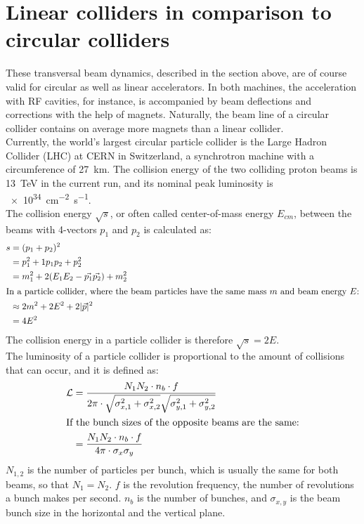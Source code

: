 \section{Linear colliders in comparison to circular colliders}
\label{AccPhysics:Linear-Circular}
These transversal beam dynamics, described in the section above, are of course valid for circular as well as linear accelerators.
In both machines, the acceleration with RF cavities, for instance, is accompanied by beam deflections and corrections with the help of magnets.
Naturally, the beam line of a circular collider contains on average more magnets than a linear collider.\\
Currently, the world's largest circular particle collider is the Large Hadron Collider (LHC) at CERN in Switzerland, a synchrotron machine with a circumference of \SI{27}{\kilo\meter}.
The collision energy of the two colliding proton beams is \SI{13}{\TeV} in the current run, and its nominal peak luminosity \lumi is \SI{e34}{\centi\meter^{-2}\second^{-1}}.~\cite[p. 3]{LHC_Paper}\\
The collision energy $\sqrt{s}$, or often called center-of-mass energy $E_{cm}$, between the beams with 4-vectors $p_1$ and $p_2$ is calculated as:
\begin{align*}
 s &= (p_1+p_2)^2\\
 &=p_1^2+1p_1p_2+p_2^2\\
 &=m_1^2+2(E_1E_2-\vec{p_1}\vec{p_2})+m_2^2\\
\intertext{In a particle collider, where the beam particles have the same mass $m$ and beam energy $E$:}
&\approx2m^2+2E^2+2|\vec{p}|^2\\
&=4E^2
\end{align*}
The collision energy in a particle collider is therefore $\sqrt{s}=2E$.\\
The luminosity of a particle collider is proportional to the amount of collisions that can occur, and it is defined as:
\begin{align}
 \mathcal{L}&=\frac{N_1N_2 \cdot n_b \cdot f}{2\pi \cdot \sqrt{\sigma^2_{x,1}+\sigma^2_{x,2}} \sqrt{\sigma^2_{y,1}+\sigma^2_{y,2}}}\\
 \intertext{If the bunch sizes of the opposite beams are the same:}
 &=\frac{N_1N_2 \cdot n_b \cdot f}{4\pi \cdot \sigma_x \sigma_y}
\end{align}
$N_{1,2}$ is the number of particles per bunch, which is usually the same for both beams, so that $N_1=N_2$.
$f$ is the revolution frequency, the number of revolutions a bunch makes per second.
$n_{b}$ is the number of bunches, and $\sigma_{x,y}$ is the beam bunch size in the horizontal and the vertical plane.
